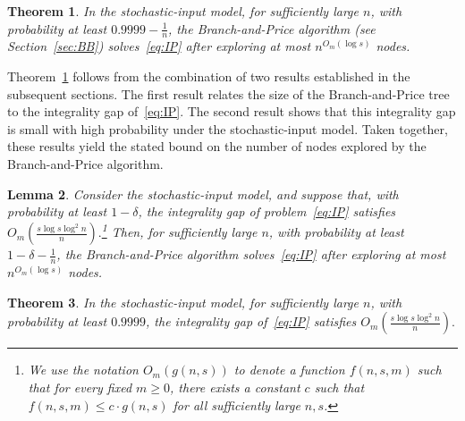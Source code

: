 \documentclass{article}
\newtheorem{thm}{Theorem}[section]
\newtheorem{lem}[thm]{Lemma}
\begin{document}
\begin{thm}\label{thm:BB_inf}
In the stochastic-input model, for sufficiently large $n$, with probability at
least $0.9999 - \frac{1}{n}$, the Branch-and-Price algorithm
(see Section~\ref{sec:BB}) solves~\eqref{eq:IP} after exploring at
most $n^{O_m(\log s)}$ nodes.
\end{thm}

Theorem~\ref{thm:BB_inf} follows from the combination of two results established
in the subsequent sections. The first result relates the size of the
Branch-and-Price tree to the integrality gap of~\eqref{eq:IP}. The second result
shows that this integrality gap is small with high probability under the
stochastic-input model. Taken together, these results yield the stated bound on
the number of nodes explored by the Branch-and-Price algorithm.

\begin{lem}\label{lem:inform_gap_to_BB}
Consider the stochastic-input model, and suppose that, with probability at least $1-\delta$, the
integrality gap of problem~\eqref{eq:IP} satisfies
$O_m\!\left( \frac{s \log s \log^2 n}{n} \right).$\footnote{We use the notation $O_m(g(n,s))$ to denote a function $f(n,s,m)$ such that for every fixed $m \ge 0$, there exists a constant $c$ such that $f(n,s,m) \le c \cdot g(n,s)$ for all sufficiently large $n,s$.}
Then, for sufficiently large $n$, with probability at least
$1 - \delta - \frac{1}{n}$, the Branch-and-Price algorithm solves~\eqref{eq:IP} after exploring at
most $n^{O_m(\log s)}$ nodes.
\end{lem}

\begin{thm}\label{thm:inform_int_gap}
In the stochastic-input model, for sufficiently large $n$, with probability at
least $0.9999$, the integrality gap of~\eqref{eq:IP} satisfies
$O_m\!\left( \frac{s \log s \log^2 n}{n} \right).$
\end{thm}
\end{document}
